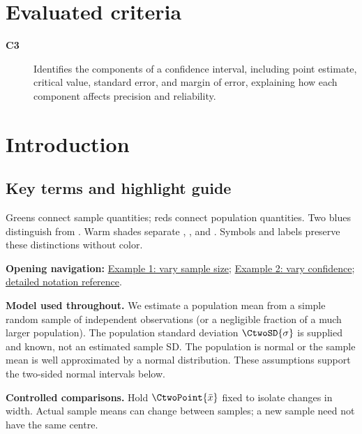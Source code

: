 \maketitle
\setcounter{tocdepth}{1}\setcounter{secnumdepth}{2}
\label{toc}\tableofcontents
\section*{Evaluated criteria}
\begin{description}
\item[\textbf{C3}] Identifies the components of a confidence interval, including point estimate, critical value, standard error, and margin of error, explaining how each component affects precision and reliability.
\end{description}

\section{Introduction}\label{sec:c3-introduction}
\subsection{Key terms and highlight guide}\label{subsec:c3-key-terms}
\label{tab:highlight-legend}

Greens connect sample quantities; reds connect population quantities. Two blues distinguish  from . Warm shades separate , ,  and . Symbols and labels preserve these distinctions without color.

\textbf{Opening navigation:} \hyperref[subsec:c3-transport-example]{Example 1: vary sample size};
\hyperref[subsec:c3-quick-check]{Example 2: vary confidence};
\hyperref[tab:notation-reference]{detailed notation reference}.

\textbf{Model used throughout.} We estimate a population mean from a simple random sample of independent observations (or a negligible fraction of a much larger population). The population standard deviation $\CtwoSD{\sigma}$ is supplied and known, not an estimated sample SD. The population is normal or the sample mean is well approximated by a normal distribution. These assumptions support the two-sided normal intervals below.

\textbf{Controlled comparisons.} Hold $\CtwoPoint{\bar{x}}$ fixed to isolate changes in width. Actual sample means can change between samples; a new sample need not have the same centre.
\clearpage
